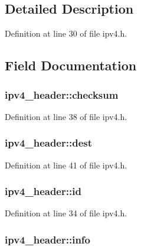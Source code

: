 \subsection{Detailed Description}


Definition at line 30 of file ipv4.\+h.



\subsection{Field Documentation}
\hypertarget{structipv4__header_ac6447b538451342a6f016aedd17eb9fa}{
\subsubsection[{checksum}]{ ipv4\+\_\+header\+::checksum}}\label{structipv4__header_ac6447b538451342a6f016aedd17eb9fa}


Definition at line 38 of file ipv4.\+h.

\hypertarget{structipv4__header_ad678f7696656cd04188dd3442294a793}{
\subsubsection[{dest}]{ ipv4\+\_\+header\+::dest}}\label{structipv4__header_ad678f7696656cd04188dd3442294a793}


Definition at line 41 of file ipv4.\+h.

\hypertarget{structipv4__header_a1b3ce4e0d6313af76d19bace542513a3}{
\subsubsection[{id}]{ ipv4\+\_\+header\+::id}}\label{structipv4__header_a1b3ce4e0d6313af76d19bace542513a3}


Definition at line 34 of file ipv4.\+h.

\hypertarget{structipv4__header_a40af269fc2efcdd3a4b85b550a376023}{
\subsubsection[{info}]{ ipv4\+\_\+header\+::info}}\label{structipv4__header_a40af269fc2efcdd3a4b85b550a376023}


